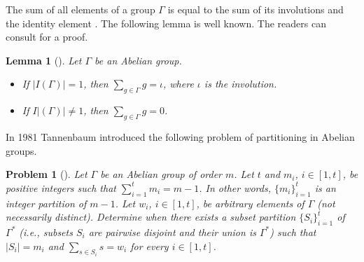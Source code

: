\documentclass[final]{dmtcs-episciences}
\newtheorem{lem}[thm]{Lemma}
\newtheorem{prob}[thm]{Problem}
\begin{document}
The sum of all elements of a group $\Gamma$ is equal to the sum of its involutions and the identity element \citep{Gallian}. {The following lemma is well known. The readers can consult \citet{ref:ComNelPal} for a proof.}


\begin{lem}[\citet{ref:ComNelPal}]\label{involutions} Let $\Gamma$  be an Abelian group.
\begin{itemize}
 \item[-] If $|I(\Gamma)|=1$, then $\sum_{g\in \Gamma}g= \iota$, where $\iota$ is the involution.
\item[-] If $I|(\Gamma)|\neq 1$, then $\sum_{g\in \Gamma}g=0$.
\end{itemize}
\end{lem}








In 1981 Tannenbaum introduced the following problem of partitioning in Abelian groups.
\begin{prob}[\citet{Tannenbaum1}]\label{problemT}
Let $\Gamma$ be an Abelian group of order $m$. Let $t$ and $m_i$, {$i\in[1,t]$}, be positive integers  such that $\sum_{i=1}^t m_i=m-1$. In other words, $\{m_i\}_{i=1}^t$ is an integer partition of $m-1$. Let $w_i$, {$i\in[1,t]$}, be arbitrary elements of $\Gamma$ (not necessarily distinct). Determine when there exists a subset partition $\{S_i\}_{i=1}^t$ of $\Gamma^*$ (i.e., subsets $S_i$ are pairwise disjoint and their union is $ \Gamma^*$) such that $|S_i|=m_i$ and $\sum_{s\in S_i}s=w_i$ for every {$i\in[1,t]$}.\end{prob}
\end{document}
